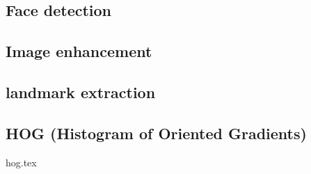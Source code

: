 \subsection{Face detection}


\subsection{Image enhancement}


\subsection{landmark extraction}


\subsection{HOG (Histogram of Oriented Gradients)}
{hog.tex}